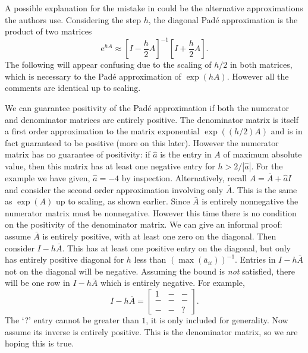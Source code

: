 A possible explanation for the mistake in \cite{blanes_pos_2022} could be the alternative approximations the authors use.
Considering the step $h$, the diagonal Pad\'e approximation is the product of two matrices
\begin{equation*}
    \mathrm{e}^{hA} \approx \left[ I - \frac{h}{2} A \right]^{-1} \left[ I + \frac{h}{2}A \right].
\end{equation*}
The following will appear confusing due to the scaling of $h/2$ in both matrices, which is necessary to the Pad\'e approximation of $\exp(hA)$.
However all the comments are identical up to scaling.

We can guarantee positivity of the Pad\'e approximation if both the numerator and denominator matrices are entirely positive.
The denominator matrix is itself a first order approximation to the matrix exponential $\exp((h/2)A)$ and is in fact guaranteed to be positive (more on this later).
However the numerator matrix has no guarantee of positivity: if $\hat{a}$ is the entry in $A$ of maximum absolute value,
then this matrix has at least one negative entry for $h > 2/|\hat{a}|$.
For the example we have given, $\hat{a} = -4$ by inspection.
Alternatively, recall $A = \bar{A} + \hat{a}I$ and consider the second order approximation involving only $\bar{A}$.
This is the same as $\exp(A)$ up to scaling, as shown earlier.
Since $\bar{A}$ is entirely nonnegative the numerator matrix must be nonnegative.
However this time there is no condition on the positivity of the denominator matrix.
We can give an informal proof:
assume $\bar{A}$ is entirely positive, with at least one zero on the diagonal.
Then consider $I - h\bar{A}$. This has at least one positive entry on the diagonal, but only has entirely positive diagonal for $h$ less than $(\max(\bar{a}_{ii}))^{-1}$.
Entries in $I - h\bar{A}$ not on the diagonal will be negative. Assuming the bound is \textit{not} satisfied, there will be one row in $I - h\bar{A}$ which is entirely negative.
For example,
\begin{equation*}
    I - h\bar{A} = \begin{bmatrix}
        1 & - & - \\
        - & - & - \\
        - & - & ?
    \end{bmatrix}.
\end{equation*}
The `?' entry cannot be greater than $1$, it is only included for generality.
Now assume its inverse is entirely positive. This is the denominator matrix, so we are hoping this is true.
